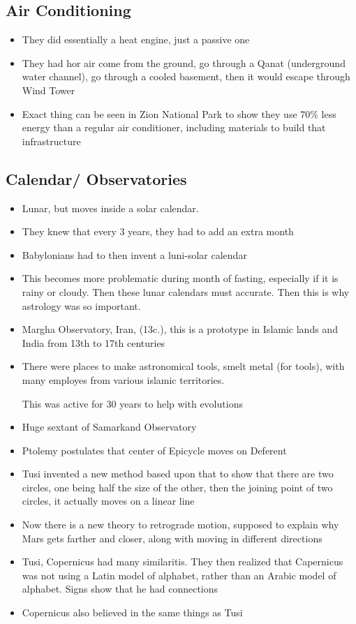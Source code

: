 \documentclass{article}
\begin{document}
\subsection{Air Conditioning}
\begin{itemize}
  \item They did essentially a heat engine, just a passive one
  \item They had hor air come from the ground, go through a Qanat
    (underground water channel), go through a cooled basement,
    then it would escape through Wind Tower
  \item Exact thing can be seen in Zion National Park to show
    they use 70\% less energy than a regular air conditioner,
    including materials to build that infrastructure
\end{itemize}

\subsection{Calendar/ Observatories}
\begin{itemize}
\item  Lunar, but moves inside a solar calendar.
\item They knew that every 3 years, they had to add an extra month
\item Babylonians had to then invent a luni-solar calendar
\item This becomes more problematic during month of fasting,
  especially if it is rainy or cloudy. Then these lunar calendars
  must accurate. Then this is why astrology was so important.
\item Margha Observatory, Iran, (13c.),
  this is a prototype in Islamic lands and India from 13th to 17th centuries
\item There were places to make astronomical tools, smelt metal (for tools), with
  many employes from various islamic territories.

  This was active for 30 years to help with evolutions
\item Huge sextant of Samarkand Observatory
\item Ptolemy postulates that center of Epicycle moves on Deferent
\item Tusi invented a new method based upon that to show that
  there are two circles, one being half the size of the other,
  then the joining point of two circles, it actually moves on a linear line
\item Now there is a new theory to retrograde motion, supposed to explain
  why Mars gets farther and closer, along with moving in different directions
\item Tusi, Copernicus had many similaritis. They then realized that Capernicus was
  not using a Latin model of alphabet, rather than an Arabic model of alphabet.
  Signs show that he had connections
\item Copernicus also believed in the same things as Tusi
\end{itemize}
\end{document}
